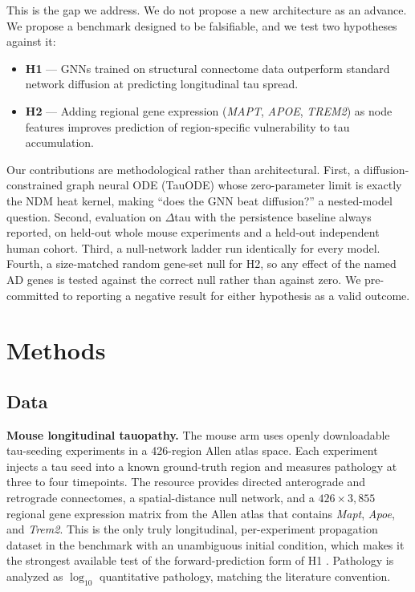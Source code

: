 \documentclass{article}
\begin{document}
This is the gap we address. We do not propose a new architecture as an advance. We propose a benchmark designed to be falsifiable, and we test two hypotheses against it:

\begin{itemize}
    \item \textbf{H1} --- GNNs trained on structural connectome data outperform standard network diffusion at predicting longitudinal tau spread.
    \item \textbf{H2} --- Adding regional gene expression (\textit{MAPT}, \textit{APOE}, \textit{TREM2}) as node features improves prediction of region-specific vulnerability to tau accumulation.
\end{itemize}

Our contributions are methodological rather than architectural. First, a diffusion-constrained graph neural ODE (TauODE) whose zero-parameter limit is exactly the NDM heat kernel, making ``does the GNN beat diffusion?'' a nested-model question. Second, evaluation on $\Delta$tau with the persistence baseline always reported, on held-out whole mouse experiments and a held-out independent human cohort. Third, a null-network ladder run identically for every model. Fourth, a size-matched random gene-set null for H2, so any effect of the named AD genes is tested against the correct null rather than against zero. We pre-committed to reporting a negative result for either hypothesis as a valid outcome.

\section{Methods}

\subsection{Data}

\textbf{Mouse longitudinal tauopathy.} The mouse arm uses openly downloadable tau-seeding experiments in a 426-region Allen atlas space. Each experiment injects a tau seed into a known ground-truth region and measures pathology at three to four timepoints. The resource provides directed anterograde and retrograde connectomes, a spatial-distance null network, and a $426 \times 3{,}855$ regional gene expression matrix from the Allen atlas that contains \textit{Mapt}, \textit{Apoe}, and \textit{Trem2}. This is the only truly longitudinal, per-experiment propagation dataset in the benchmark with an unambiguous initial condition, which makes it the strongest available test of the forward-prediction form of H1 \cite{henderson2019, cornblath2021}. Pathology is analyzed as $\log_{10}$ quantitative pathology, matching the literature convention.
\end{document}
